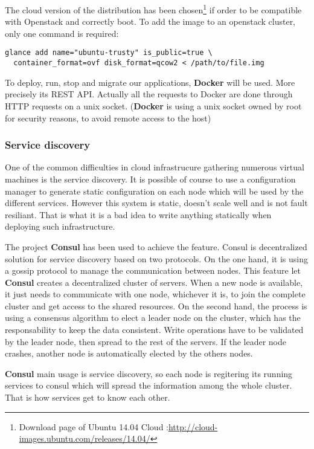 The cloud version of the distribution has been chosen\footnote{Download page of
Ubuntu 14.04 Cloud :\url{http://cloud-images.ubuntu.com/releases/14.04/}} if
order to be compatible with Openstack and correctly boot. To add the image to
an openstack cluster, only one command is required:

\vspace{1em}
\begin{lstlisting}
glance add name="ubuntu-trusty" is_public=true \ 
  container_format=ovf disk_format=qcow2 < /path/to/file.img
\end{lstlisting}

To deploy, run, stop and migrate our applications, \textbf{Docker} will be
used. More precisely its REST API. Actually all the requests to Docker are done
through HTTP requests on a unix socket. (\textbf{Docker} is using a unix socket
owned by root for security reasons, to avoid remote access to the host)

\subsubsection{Service discovery}

One of the common difficulties in cloud infrastrucure gathering numerous
virtual machines is the service discovery. It is possible of course to use a
configuration manager to generate static configuration on each node which will
be used by the different services. However this system is static, doesn't scale
well and is not fault resiliant. That is what it is a bad idea to write
anything statically when deploying such infrastructure.

The project \textbf{Consul} has been used to achieve the feature. Consul is
decentralized solution for service discovery based on two protocols. On the one
hand, it is using a gossip protocol to manage the communication between nodes.
This feature let \textbf{Consul} creates a decentralized cluster of servers.
When a new node is available, it just needs to communicate with one node,
whichever it is, to join the complete cluster and get access to the shared
resources. On the second hand, the process is using a consensus algorithm to
elect a leader node on the cluster, which has the responsability to keep the
data consistent. Write operations have to be validated by the leader node, then
spread to the rest of the servers. If the leader node crashes, another node is
automatically elected by the others nodes.

\textbf{Consul} main usage is service discovery, so each node is regitering its
running services to consul which will spread the information among the whole
cluster. That is how services get to know each other.

